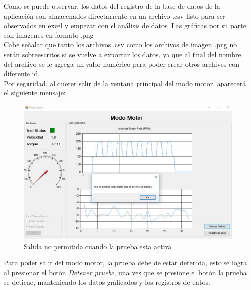 \documentclass[12pt,titlepage]{article}
\begin{document}
Como se puede observar, los datos del registro de la base de datos de la aplicación son almacenados directamente en un archivo .csv listo para ser observados en excel y empezar con el análisis de datos.  Las gráficas por su parte son imagenes en formato .png  \\

Cabe señalar que tanto los archivos .csv como los archivos de imagen .png no serán sobreescritos si se vuelve a exportar los datos, ya que al final del nombre del archivo se le agrega un valor numérico para poder crear otros archivos con diferente id. \\ 
\newpage
Por seguridad, al querer salir de la ventana principal del modo motor, aparecerá el siguiente mensaje: 
\begin{figure}[htbp]
\hspace*{2.8cm} 
\includegraphics[scale=0.48]{Security}
\caption{Salida no permitida cuando la prueba esta activa}
\end{figure}

\newpage

Para poder salir del modo motor, la prueba debe de estar detenida, esto se logra al presionar el botón \textit{Detener prueba}, una vez que se presione el botón la prueba se detiene, manteniendo los datos gráficados y los registros de datos. \\ 
\end{document}
